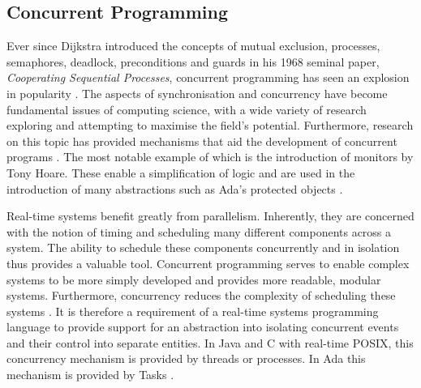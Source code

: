 \subsection{Concurrent Programming}
Ever since Dijkstra introduced the concepts of mutual exclusion, processes,
semaphores, deadlock, preconditions and guards in his 1968 seminal paper,
\emph{Cooperating Sequential Processes}, concurrent programming has seen an
explosion in popularity \cite{Dijkstra}.  The aspects of synchronisation and
concurrency have become fundamental issues of computing science, with a wide
variety of research exploring and attempting to maximise the field's
potential. Furthermore, research on this topic has provided mechanisms that aid 
the development of concurrent programs
\cite{Sutter:2005:SCR:1095408.1095421,Hansen:1972:SM:361454.361473}.  The most
notable example of which is the introduction of monitors by Tony Hoare.
These enable a simplification of logic and are used in the introduction of many
abstractions such as Ada's protected objects
\cite{Hoare:1974:MOS:355620.361161}.  
\par\bigskip\noindent
Real-time systems benefit greatly from parallelism. Inherently, they are
concerned with the notion of timing and scheduling many different components
across a system.  The ability to schedule these components concurrently and in
isolation thus provides a valuable tool. Concurrent programming serves to
enable complex systems to be more simply developed and provides 
more readable, modular systems. Furthermore, concurrency reduces the complexity
of scheduling these systems \cite{real-time-systems}.  It is therefore a
requirement of a real-time systems programming language to provide support for
an abstraction into isolating concurrent events and their control into separate
entities.  In Java and C with real-time POSIX, this concurrency mechanism is
provided by threads or processes. In Ada this mechanism is provided by Tasks
\cite[p251]{gehani1989concurrent}.

